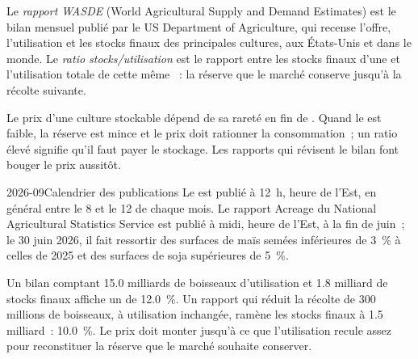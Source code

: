 \begin{definition}\label{def:m3:agriculturals-and-softs:wasde}
Le \emph{rapport WASDE} (World Agricultural Supply and Demand Estimates) est le bilan mensuel publié par le
US Department of Agriculture, qui recense l'offre, l'utilisation et les stocks finaux des principales cultures,
aux États-Unis et dans le monde. Le \emph{ratio stocks/utilisation} est le
rapport entre les stocks finaux d'une  et l'utilisation totale de cette même ~: la réserve que le marché
conserve jusqu'à la récolte suivante.
\end{definition}

Le prix d'une culture stockable dépend de sa rareté en fin de . Quand le
 est faible, la réserve est mince et le prix doit rationner la consommation~; un ratio élevé
signifie qu'il faut payer le stockage. Les rapports qui révisent le bilan font bouger le prix aussitôt.

\begin{dated}{2026-09}{Calendrier des publications}\label{dat:m3:agriculturals-and-softs:reports}
Le  est publié à 12~h, heure de l'Est, en général entre le 8 et le 12 de chaque mois. Le
rapport Acreage du National Agricultural Statistics Service est publié à midi, heure de l'Est, à la fin
de juin~; le 30 juin 2026, il fait ressortir des surfaces de maïs semées inférieures de 3~\% à celles de 2025 et des surfaces de soja supérieures de 5~\%.
\end{dated}

\begin{example}\label{ex:m3:agriculturals-and-softs:stu}
Un bilan comptant 15.0 milliards de boisseaux d'utilisation et 1.8 milliard de stocks finaux affiche un
 de 12.0~\%. Un rapport qui réduit la récolte de 300 millions de boisseaux, à utilisation inchangée, ramène
les stocks finaux à 1.5 milliard~: 10.0~\%. Le prix doit monter jusqu'à ce que l'utilisation recule assez pour reconstituer la réserve que
le marché souhaite conserver.
\end{example}

